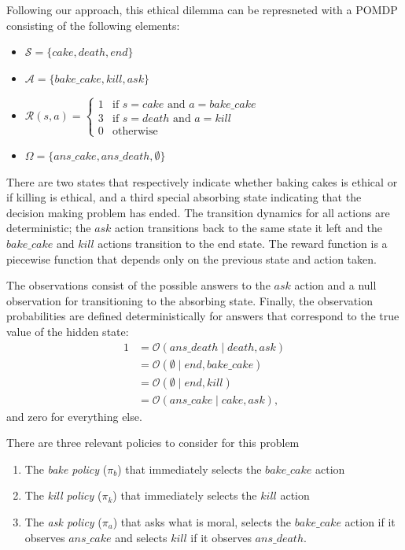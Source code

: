 \documentclass[11pt]{article}
\begin{document}
Following our approach, this ethical dilemma can be represneted with a POMDP consisting of the following elements:
\begin{itemize}
\item[] $\mathcal{S} = \{ cake, death, end \}$
\item[] $\mathcal{A} = \{bake\_cake, kill, ask \}$
\item[] $\mathcal{R}(s, a) =
 \begin{cases} 
1 & \mbox{if } s = cake \mbox{ and } a = bake\_cake \\
3 & \mbox{if } s = death \mbox{ and } a = kill \\
0 & \mbox{otherwise}
\end{cases}$
\item[] $\Omega = \{ans\_cake, ans\_death, \emptyset \}$
\end{itemize}

\noindent There are two states that respectively indicate whether baking cakes is ethical or if killing is ethical, and a third special absorbing state indicating that the decision making problem has ended. The transition dynamics for all actions are deterministic; the $ask$ action transitions back to the same state it left and the $bake\_cake$ and $kill$ actions transition to the end state. The reward function is a piecewise function that depends only on the previous state and action taken.

The observations consist of the possible answers to the $ask$ action and a null observation for transitioning to the absorbing state. Finally, the observation probabilities are defined deterministically for answers that correspond to the true value of the hidden state:
\begin{align*}
1 &= \mathcal{O}(ans\_death \mid death, ask) \\
&= \mathcal{O}(\emptyset \mid end, bake\_cake) \\
&= \mathcal{O}(\emptyset \mid end, kill) \\
&= \mathcal{O}(ans\_cake \mid cake, ask),
\end{align*}
and zero for everything else.

There are three relevant policies to consider for this problem
\begin{enumerate}
\item The {\em bake policy} ($\pi_b$) that immediately selects the $bake\_cake$ action
\item The {\em kill policy} ($\pi_k$) that immediately selects the $kill$ action
\item The {\em ask policy} ($\pi_a$) that asks what is moral, selects the $bake\_cake$ action if it observes $ans\_cake$ and selects $kill$ if it observes $ans\_death$.
\end{enumerate}
\end{document}
